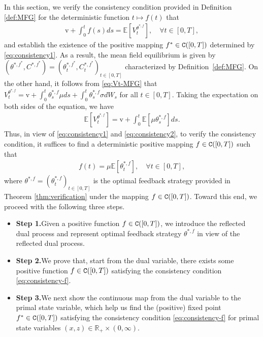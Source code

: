 \documentclass[11pt,times,letter]{article}
\newcommand{\Ex}{ \mathbb{E} }
\newcommand{\R}{\mathds{R}}
\newcommand{\C}{{\tt{C}}}
\numberwithin{equation}{section}
\begin{document}
In this section,  we verify the consistency condition provided in Definition \ref{def:MFG} for the deterministic function $t\mapsto f(t)$ that
\begin{align}\label{eq:consistency1}
\mathrm{v}+\int_0^t f(s)ds=\mathbb{E}\left[V_t^{\theta^{*,f}}\right], \quad \forall t\in [0,T],
\end{align}
and establish the existence of the positive mapping $f^*\in\C([0,T])$ determined by \eqref{eq:consistency1}. As a result, the mean field equilibrium is given by $(\theta^{*,f^*},C^{*,f^*})=(\theta_t^{*,f^*},C_t^{*,f^*})_{t\in[0,T]}$ characterized by Definition~\ref{def:MFG}. On the other hand, it follows from \eqref{eq:Vt-MFG} that $V_t^{\theta^{*,f}}=\mathrm{v}+\int_0^t \theta_s^{*,f} \mu ds+\int_0^t \theta_s^{*,f}\sigma dW_s$ for all $t\in[0,T]$. Taking the expectation on both sides of the equation, we have
\begin{align}\label{eq:consistency2}
\Ex\left[V_t^{\theta^{*,f}}\right]=\mathrm{v}+\int_0^t \Ex[\mu\theta_s^{*,f}]  ds.
\end{align}
Thus, in view of \eqref{eq:consistency1} and \eqref{eq:consistency2}, to verify the consistency condition, it suffices to find a deterministic positive mapping $f\in\C([0,T])$ such that
\begin{align}\label{eq:consistency-f}
f(t)= \mu\Ex\left[\theta_t^{*,f}\right],\quad\forall t\in[0,T],
\end{align}
where $\theta^{*,f}=(\theta_t^{*,f})_{t\in[0,T]}$ is the optimal feedback strategy provided in Theorem \ref{thm:verification} under the mapping $f\in\C([0,T])$. Toward this end, we proceed with the following three steps.
\begin{itemize} 
\item[]{\bf Step 1.}\quad Given a positive function $f\in\C([0,T])$, we introduce the reflected dual process and represent optimal feedback strategy $\theta^{*,f}$ in view of the reflected dual process.
\item[]{\bf Step 2.}\quad We prove that, start from the dual variable, there exists some positive function $f\in\C([0,T])$ satisfying the consistency condition \eqref{eq:consistency-f}.
\item[]{\bf Step 3.}\quad We next show the continuous map from the dual variable to the primal state variable, which help us find the (positive) fixed point $f^*\in\C([0,T])$ satisfying the consistency condition \eqref{eq:consistency-f} for primal state variables $(x,z)\in\R_+\times (0,\infty)$. 
\end{itemize}
\end{document}
